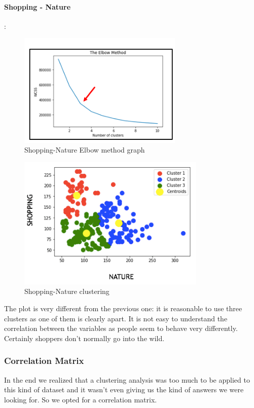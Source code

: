 \paragraph*{Shopping - Nature}:
\begin{figure}[H]
\centering
\includegraphics[width=0.7\textwidth]{Img/3_elbow.png}
\caption{Shopping-Nature Elbow method graph}
\end{figure}
\begin{figure}[H]
\centering
\hspace{-1.8cm}
\includegraphics[width=0.8\textwidth]{Img/3_cluster.png}
\caption{Shopping-Nature clustering}
\end{figure}

\noindent The plot is very different from the previous one: it is reasonable to use three clusters as one of them is clearly apart. It is not easy to understand the correlation between the variables as people seem to behave very differently. Certainly shoppers don't normally go into the wild.
\clearpage

\subsubsection{Correlation Matrix}
In the end we realized that a clustering analysis was too much to be applied to this kind of dataset and it wasn't even giving us the kind of answers we were looking for. So we opted for a correlation matrix.


